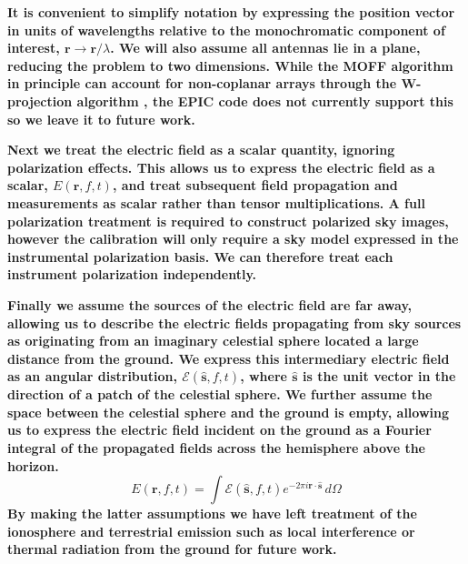 \documentclass[a4paper,fleqn,usenatbib]{../mnras}
\begin{document}
\textbf{It is convenient to simplify notation by expressing the position vector in units of wavelengths relative to the monochromatic component of interest, 
$\mathbf{r}\rightarrow \mathbf{r}/\lambda$. We will also assume all antennas lie in a plane, 
reducing the problem to two dimensions. While the MOFF algorithm in principle can account for 
non-coplanar arrays through the W-projection algorithm \citep{cor08}, the EPIC code does not 
currently support this so we leave it to future work.}

\textbf{Next we treat the electric field as a scalar quantity, ignoring polarization effects. This allows us 
to express the electric field as a scalar, $E(\mathbf{r},f,t)$, and treat subsequent field 
propagation and measurements as scalar rather than tensor multiplications. A full polarization 
treatment is required to construct polarized sky images, however the calibration will only 
require a sky model expressed in the instrumental polarization basis. We can therefore treat 
each instrument polarization independently.}

\textbf{Finally we assume the sources of the electric field are far away, allowing us to describe the 
electric fields propagating from sky sources as originating from an imaginary celestial sphere 
located a large distance from the ground. We express this intermediary electric field as an 
angular distribution, $\mathcal{E}(\hat{\mathbf{s}},f,t)$, where $\hat{\mathbf{s}}$ is the unit 
vector in the direction of a patch of the celestial sphere. We further assume the space between 
the celestial sphere and the ground is empty, allowing us to express the electric field incident 
on the ground as a Fourier integral of the propagated fields across the hemisphere above the horizon.
\begin{equation}\label{eq:sky_propagated}
E(\mathbf{r},f,t) = \int \mathcal{E}(\hat{\mathbf{s}},f,t) e^{-2\pi i \mathbf{r} \cdot \hat{\mathbf{s}}}\, d\Omega
\end{equation}  
By making the latter assumptions we have left treatment of the ionosphere and terrestrial 
emission such as local interference or thermal radiation from the ground for future work. }
\end{document}
